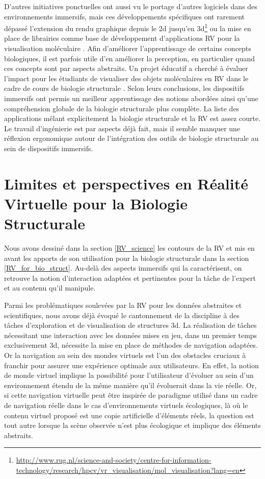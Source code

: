 D'autres initiatives ponctuelles ont aussi vu le portage d'autres logiciels dans des environnements immersifs, mais ces développements spécifiques ont rarement dépassé l'extension du rendu graphique depuis le 2d jusqu'en 3d\footnote{\url{http://www.rug.nl/science-and-society/centre-for-information-technology/research/hpcv/vr\_visualisation/mol\_visualisation?lang=en}} ou la mise en place de librairies comme base de développement d'applications RV pour la visualisation moléculaire \cite{salvadori_moka:_2014}.  Afin d'améliorer l'apprentissage de certains concepts biologiques, il est parfois utile d'en améliorer la perception, en particulier quand ces concepts sont par aspects abstraits. Un projet éducatif a cherché à évaluer l'impact pour les étudiants de visualiser des objets moléculaires en RV dans le cadre de cours de biologie structurale \cite{tan_use_2013}. Selon leurs conclusions, les dispositifs immersifs ont permis un meilleur apprentissage des notions abordées ainsi qu'une compréhension globale de la biologie structurale plus complète.
La liste des applications mêlant explicitement la biologie structurale et la RV est assez courte. Le travail d'ingénierie est par aspects déjà fait, mais il semble manquer une réflexion ergonomique autour de l'intégration des outils de biologie structurale au sein de dispositifs immersifs.


\section{Limites et perspectives en Réalité Virtuelle pour la Biologie Structurale} %
\label{sec:RV_perspectives}

Nous avons dessiné dans la section \ref{RV_science} les contours de la RV et mis en avant les apports de son utilisation pour la biologie structurale dans la section \ref{RV_for_bio_struct}. Au-delà des aspects immersifs qui la caractérisent, on retrouve la notion d'interaction adaptées et pertinentes pour la tâche de l'expert et au contenu qu'il manipule.

Parmi les problématiques soulevées par la RV pour les données abstraites et scientifiques, nous avons déjà évoqué le cantonnement de la discipline à des tâches d'exploration et de visualisation de structures 3d. La réalisation de tâches nécessitant une interaction avec les données mises en jeu, dans un premier temps exclusivement 3d, nécessite la mise en place de méthodes de navigation adaptées. Or la navigation au sein des mondes virtuels est l'un des obstacles cruciaux à franchir pour assurer une expérience optimale aux utilisateurs. En effet, la notion de monde virtuel implique la possibilité pour l'utilisateur d'évoluer au sein d'un environnement étendu de la même manière qu'il évoluerait dans la vie réelle. Or, si cette navigation virtuelle peut être inspirée de paradigme utilisé dans un cadre de navigation réelle dans le cas d'environnements virtuels écologiques, là où le contenu virtuel proposé est une copie artificielle d'éléments réels, la question est tout autre lorsque la scène observée n'est plus écologique et implique des éléments abstraits. 

